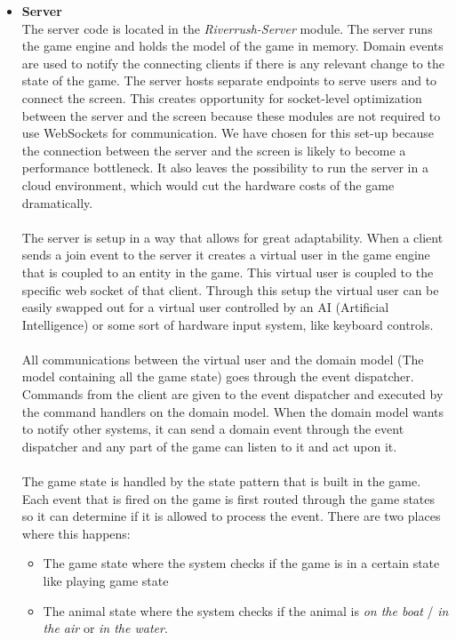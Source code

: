\documentclass[11pt,a4paper]{article}
\begin{document}
\begin{itemize}
\item \textbf{Server} \\
The server code is located in the \emph{Riverrush-Server} module. The server runs the game engine and holds the model of the game in memory. Domain events are used to notify the connecting clients if there is any relevant change to the state of the game. The server hosts separate endpoints to serve users and to connect the screen. This creates opportunity for socket-level optimization between the server and the screen because these modules are not required to use WebSockets for communication. We have chosen for this set-up because the connection between the server and the screen is likely to become a performance bottleneck. It also leaves the possibility to run the server in a cloud environment, which would cut the hardware costs of the game dramatically.\\
\\
The server is setup in a way that allows for great adaptability. When a client sends a join event to the server it creates a virtual user in the game engine that is coupled to an entity in the game. This virtual user is coupled to the specific web socket of that client. Through this setup the virtual user can be easily swapped out for a virtual user controlled by an AI (Artificial Intelligence) or some sort of hardware input system, like keyboard controls.\\
\\
All communications between the virtual user and the domain model (The model containing all the game state) goes through the event dispatcher. Commands from the client are given to the event dispatcher and executed by the command handlers on the domain model. When the domain model wants to notify other systems, it can send a domain event through the event dispatcher and any part of the game can listen to it and act upon it.\\
\\
The game state is handled by the state pattern that is built in the game. Each event that is fired on the game is first routed through the game states so it can determine if it is allowed to process the event. There are two places where this happens: 
\begin{itemize}
\item 
The game state where the system checks if the game is in a certain state like playing game state
\item
The animal state where the system checks if the animal is \emph{on the boat} / \emph{in the air} or \emph{in the water}.
\end{itemize}


\end{itemize}
\end{document}
